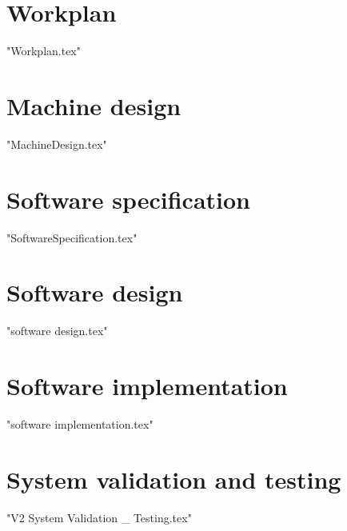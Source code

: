 \documentclass[a4paper,oneside,11pt]{report}
\begin{document}
\chapter{Workplan}
{"Workplan.tex"}

\chapter{Machine design}
{"MachineDesign.tex"} 

\chapter{Software specification}
{"SoftwareSpecification.tex"}

\chapter{Software design}
{"software design.tex"}

\chapter{Software implementation}
{"software implementation.tex"} 

\chapter{System validation and testing}
{"V2 System Validation _ Testing.tex"}
\end{document}
